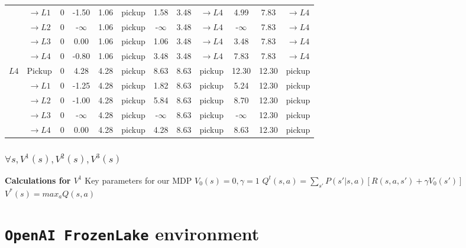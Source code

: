\documentclass[12pt, letterpaper]{article}
\begin{document}
\begin{footnotesize}
\begin{tabular}{|l|c|c|c|c|c|c|c|c|c|c|c|}
                            & $\rightarrow L1$  & 0 & -1.50     & 1.06 & pickup & 1.58 & 3.48 & $\rightarrow L4$ & 4.99 & 7.83 & $\rightarrow L4$ \\ \cline{2-12}
                            & $\rightarrow L2$  & 0 & -$\infty$ & 1.06 & pickup & -$\infty$ & 3.48 & $\rightarrow L4$ & -$\infty$ & 7.83 & $\rightarrow L4$ \\ \cline{2-12}
                            & $\rightarrow L3$  & 0 & 0.00      & 1.06 & pickup & 1.06 & 3.48 & $\rightarrow L4$ & 3.48 & 7.83 & $\rightarrow L4$ \\ \cline{2-12}
                            & $\rightarrow L4$  & 0 & -0.80     & 1.06 & pickup & 3.48 & 3.48 & $\rightarrow L4$ & 7.83 & 7.83  & $\rightarrow L4$ \\ \cline{2-12}
    \hline
    \multirow{5}{*}{$L4$}   & Pickup            & 0 & 4.28      & 4.28  & pickup    & 8.63          & 8.63  & pickup    & 12.30     & 12.30 & pickup \\ \cline{2-12}
                            & $\rightarrow L1$  & 0 & -1.25     & 4.28  & pickup    & 1.82          & 8.63  & pickup    & 5.24      & 12.30 & pickup \\ \cline{2-12}
                            & $\rightarrow L2$  & 0 & -1.00     & 4.28  & pickup    & 5.84          & 8.63  & pickup    & 8.70      & 12.30 & pickup  \\ \cline{2-12}
                            & $\rightarrow L3$  & 0 & -$\infty$ & 4.28  & pickup    & -$\infty$     & 8.63  & pickup    & -$\infty$ & 12.30 & pickup  \\ \cline{2-12}
                            & $\rightarrow L4$  & 0 & 0.00      & 4.28  & pickup    & 4.28          & 8.63  & pickup    & 8.63      & 12.30 & pickup  \\ \cline{2-12}
    \hline
    \end{tabular}
\end{footnotesize}

\subsubsection{$\forall s,V^1(s),V^2(s),V^3(s)$}

\textbf{Calculations for $V^1$}
Key parameters for our MDP
$V_0(s) = 0, \gamma = 1$ 
$Q^t(s,a) = \sum_{s'} P(s'|s,a)[R(s,a,s')+ \gamma V_0(s')]$
$V^*(s)=max_aQ(s,a)$

\section{\texttt{OpenAI FrozenLake} environment}
\end{document}
